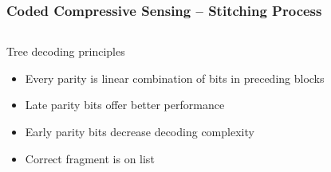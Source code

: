 
\begin{frame}
\frametitle{Coded Compressive Sensing -- Stitching Process}
\begin{center}

\end{center}
\begin{columns}
\begin{block}{Tree decoding principles}
  \begin{itemize}
  \item Every parity is linear combination of bits in preceding blocks
  \item Late parity bits offer better performance
  \item Early parity bits decrease decoding complexity
  \item Correct fragment is on list
  \end{itemize}
\end{block}
  \centerline{\scalebox{0.5}{}}
\end{columns}
\end{frame}


